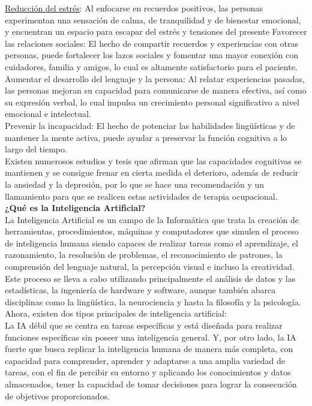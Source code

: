 \underline{Reducción del estrés}: Al enfocarse en recuerdos positivos, las personas experimentan una sensación de calma, de tranquilidad y de bienestar emocional, y encuentran un espacio para escapar del estrés y tensiones del presente
Favorecer las relaciones sociales: El hecho de compartir recuerdos y experiencias con otras personas, puede fortalecer los lazos sociales y fomentar una mayor conexión con cuidadores, familia y amigos, lo cual es altamente satisfactorio para el paciente.\\

Aumentar el desarrollo del lenguaje y la persona: Al relatar experiencias pasadas, las personas mejoran su capacidad para comunicarse de manera efectiva, así como su expresión verbal, lo cual impulsa un crecimiento personal significativo a nivel emocional e intelectual.\\

Prevenir la incapacidad: El hecho de potenciar las habilidades lingüísticas y de mantener la mente activa, puede ayudar a preservar la función cognitiva a lo largo del tiempo. \\

Existen numerosos estudios y tesis que afirman que las capacidades cognitivas se mantienen y se consigue frenar en cierta medida el deterioro, además de reducir la ansiedad y la depresión, por lo que se hace una recomendación y un llamamiento para que se realicen estas actividades de terapia ocupacional.\\

\textbf{¿Qué es la Inteligencia Artificial?}\\

La Inteligencia Artificial es un campo de la Informática que trata la creación de herramientas, procedimientos, máquinas y computadores que simulen el proceso de inteligencia humana siendo capaces de realizar tareas como el aprendizaje, el razonamiento, la resolución de problemas, el reconocimiento de patrones, la comprensión del lenguaje natural, la percepción visual e incluso la creatividad. Este proceso se lleva a cabo utilizando principalmente el análisis de datos y las estadísticas, la ingeniería de hardware y software, aunque también abarca disciplinas como la lingüística, la neurociencia y hasta la filosofía y la psicología.\\

Ahora, existen dos tipos principales de inteligencia artificial:\\
La IA débil que se centra en tareas específicas y está diseñada para realizar funciones específicas sin poseer una inteligencia general. Y, por otro lado, la IA fuerte que busca replicar la inteligencia humana de manera más completa, con capacidad para comprender, aprender y adaptarse a una amplia variedad de tareas, con el fin de percibir su entorno y aplicando los conocimientos y datos almacenados, tener la capacidad de tomar decisiones para lograr la consecución de objetivos proporcionados.\\

